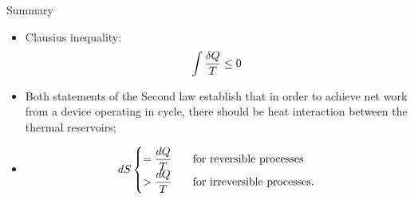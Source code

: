    
\clearpage   
\begin{FinalSummaryBlock}{Summary}
    \begin{itemize}
       \item Clausius inequality:
            \begin{displaymath}
                \displaystyle\int \displaystyle\frac{\delta Q}{T} \le 0
            \end{displaymath}
       \item Both statements of the Second law establish that in order to achieve net work from a device operating in cycle, there should be heat interaction between the thermal reservoirs;
       \item 
           \begin{displaymath}
               dS
                \begin{cases}
                      = \displaystyle\frac{dQ}{T} & \;\;\text{ for reversible processes} \\
                      > \displaystyle\frac{dQ}{T} & \;\;\text{ for irreversible processes}.
                \end{cases}
           \end{displaymath}
    \end{itemize}
\end{FinalSummaryBlock}



\clearpage
